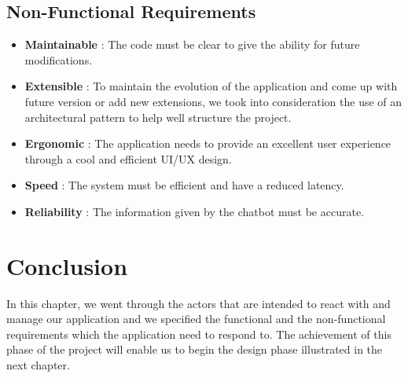 \subsection{Non-Functional Requirements}
\begin{itemize}
    \item \textbf{Maintainable} : The code must be clear to give the ability for future modifications.
    \item \textbf{Extensible} : To maintain the evolution of the application and come up with future version or add new extensions, we took into consideration the use of an architectural pattern to help well structure the project. 
    \item \textbf{Ergonomic} : The application needs to provide an excellent user experience through a cool and efficient UI/UX design.
    \item \textbf{Speed} : The system must be efficient and have a reduced latency.
    \item \textbf{Reliability} : The information given by the chatbot must be accurate.
\end{itemize}
\section{Conclusion}
In this chapter, we went through the actors that are intended to react with and manage our application and we specified the functional and the non-functional requirements which the application need to respond to. The achievement of this phase of the project will enable us to begin the design phase illustrated in the next chapter. 

